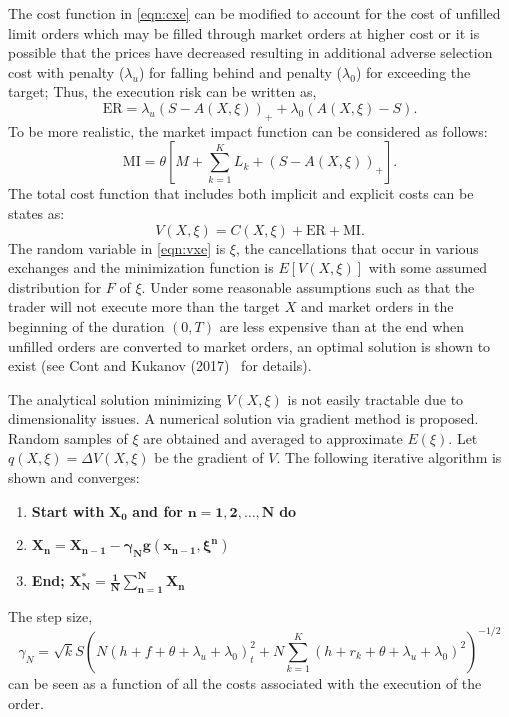 The cost function in \eqref{eqn:cxe} can be modified to account for the cost of unfilled limit orders which may be filled through market orders at higher cost or it is possible that the prices have decreased resulting in additional adverse selection cost with penalty ($\lambda_u$) for falling behind and penalty ($\lambda_0$) for exceeding the target; Thus, the execution risk can be written as,
	\begin{equation}\label{eqn:er}
	\text{ER}= \lambda_u (S-A(X,\xi))_+ + \lambda_0 (A(X,\xi)-S).
	\end{equation}
To be more realistic, the market impact function can be considered as follows:
	\begin{equation}\label{eqn:mi}
	\text{MI}= \theta \left[ M + \sum_{k=1}^K L_k + (S-A(X,\xi))_+ \right].
	\end{equation}
The total cost function that includes both implicit and explicit costs can be states as:
	\begin{equation}\label{eqn:vxe}
	V(X,\xi)= C(X,\xi) + \text{ER} + \text{MI}.
	\end{equation}
The random variable in \eqref{eqn:vxe} is $\xi$, the cancellations that occur in various exchanges and the minimization function is $E[V(X,\xi)]$ with some assumed distribution for $F$ of $\xi$. Under some reasonable assumptions such as that the trader will not execute more than the target $X$ and market orders in the beginning of the duration $(0,T)$ are less expensive than at the end when unfilled orders are converted to market orders, an optimal solution is shown to exist (see Cont and Kukanov (2017)~\cite{contk} for details).


The analytical solution minimizing $V(X,\xi)$ is not easily tractable due to dimensionality issues. A numerical solution via gradient method is proposed. Random samples of $\xi$ are obtained and averaged to approximate $E(\xi)$. Let $q(X,\xi)= \Delta V(X,\xi)$ be the gradient of $V$. The following iterative algorithm is shown and converges:
	\begin{enumerate}[--]
	\item \textbf{Start with }$\mathbf{X_0}$\textbf{ and for }$\mathbf{n=1,2,\ldots,N}$\textbf{ do}
	\item $\mathbf{X_n=X_{n-1} - \gamma_N g(x_{n-1}, \xi^n)}$
	\item \textbf{End; }$\mathbf{X_N^* = \frac{1}{N} \sum_{n=1}^N X_n}$
	\end{enumerate}
The step size, \small
	\begin{equation} \label{eqn:7gammaN}
	 \gamma_N = \sqrt{k} S \left( N(h+f+\theta+\lambda_u +\lambda_0)^2 _ t + N \sum_{k=1}^K (h+r_k+\theta+\lambda_u+\lambda_0)^2 \right)^{-1/2} 
	\end{equation}
can be seen as a function of all the costs associated with the execution of the order.


